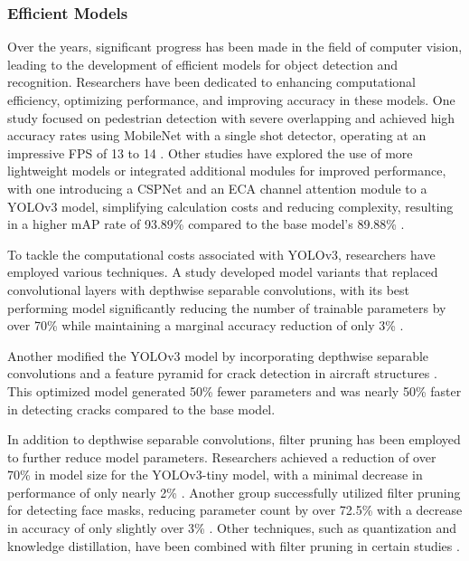 \subsubsection{Efficient Models} \label{efficient_ex}
Over the years, significant progress has been made in the field of computer vision, leading to the development of efficient models for object detection and recognition. Researchers have been dedicated to enhancing computational efficiency, optimizing performance, and improving accuracy in these models. One study focused on pedestrian detection with severe overlapping and achieved high accuracy rates using MobileNet with a single shot detector, operating at an impressive FPS of 13 to 14 \cite{ahmedEnhancedVulnerablePedestrian2019}. Other studies have explored the use of more lightweight models or integrated additional modules for improved performance, with one introducing a CSPNet and an ECA channel attention module to a YOLOv3 model, simplifying calculation costs and reducing complexity, resulting in a higher mAP rate of 93.89\% compared to the base model's 89.88\% \cite{gongPedestrianDetectionAlgorithm2022}.

To tackle the computational costs associated with YOLOv3, researchers have employed various techniques. A study developed model variants that replaced convolutional layers with depthwise separable convolutions, with its best performing model significantly reducing the number of trainable parameters by over 70\% while maintaining a marginal accuracy reduction of only 3\% \cite{chakarDepthwiseSeparableConvolutions2020}. 

Another modified the YOLOv3 model by incorporating depthwise separable convolutions and a feature pyramid for crack detection in aircraft structures \cite{liYOLOv3LiteLightweightCrack2019}. This optimized model generated 50\% fewer parameters and was nearly 50\% faster in detecting cracks compared to the base model.

In addition to depthwise separable convolutions, filter pruning has been employed to further reduce model parameters. Researchers achieved a reduction of over 70\% in model size for the YOLOv3-tiny model, with a minimal decrease in performance of only nearly 2\% \cite{qianEfficientModelCompression2018}. Another group successfully utilized filter pruning for detecting face masks, reducing parameter count by over 72.5\% with a decrease in accuracy of only slightly over 3\% \cite{liberatoriYOLOBasedFaceMask2022}. Other techniques, such as quantization and knowledge distillation, have been combined with filter pruning in certain studies \cite{endrawatiYOLOv3TinyWeight2021, shiOptimizedYolov3Deployment2021, wuModelCompressionBased2021}.

